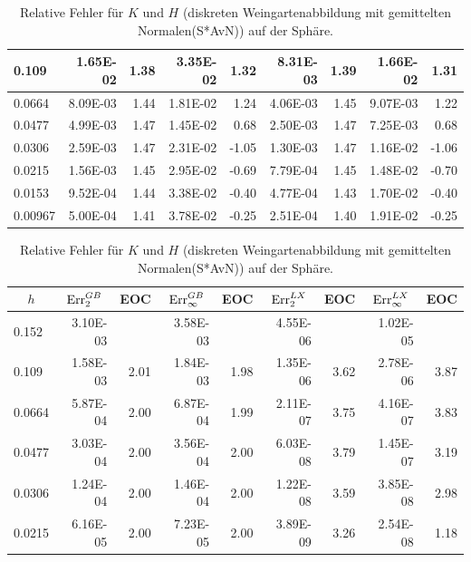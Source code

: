 \begin{table}[htbp]
\begin{tabular}{|l|r|r|r|r|r|r|r|r|}
            0.109 & 1.65E-02 & 1.38 & 3.35E-02 & 1.32 & 8.31E-03 & 1.39 & 1.66E-02 & 1.31 \\ \hline
            0.0664 & 8.09E-03 & 1.44 & 1.81E-02 & 1.24 & 4.06E-03 & 1.45 & 9.07E-03 & 1.22 \\ \hline
            0.0477 & 4.99E-03 & 1.47 & 1.45E-02 & 0.68 & 2.50E-03 & 1.47 & 7.25E-03 & 0.68 \\ \hline
            0.0306 & 2.59E-03 & 1.47 & 2.31E-02 & -1.05 & 1.30E-03 & 1.47 & 1.16E-02 & -1.06 \\ \hline
            0.0215 & 1.56E-03 & 1.45 & 2.95E-02 & -0.69 & 7.79E-04 & 1.45 & 1.48E-02 & -0.70 \\ \hline
            0.0153 & 9.52E-04 & 1.44 & 3.38E-02 & -0.40 & 4.77E-04 & 1.43 & 1.70E-02 & -0.40 \\ \hline
            0.00967 & 5.00E-04 & 1.41 & 3.78E-02 & -0.25 & 2.51E-04 & 1.40 & 1.91E-02 & -0.25 \\ \hline
      \end{tabular}
      \caption[Weingarten auf der Sphäre]{Relative Fehler für \( K \) und \( H \) (diskreten Weingartenabbildung mit gemittelten Normalen(S*AvN)) auf der Sphäre.}
      \label{tabSphereWeingartenAvN}
      \vspace{10pt}
      \begin{tabular}{|l|r|r|r|r|r|r|r|r|}
      \hline
      \multicolumn{1}{|c|}{\rule{0pt}{11pt}\( h \)} & \multicolumn{1}{c|}{\( \text{Err}_{2}^{GB} \)} & \multicolumn{1}{c|}{EOC} & 
           \multicolumn{1}{c|}{\( \text{Err}_{\infty}^{GB} \)} & \multicolumn{1}{c|}{EOC} & \multicolumn{1}{c|}{\( \text{Err}_{2}^{LX} \)} &
           \multicolumn{1}{c|}{EOC} & \multicolumn{1}{c|}{\( \text{Err}_{\infty}^{LX} \)} & \multicolumn{1}{c|}{EOC} \\ \hline
           0.152 & 3.10E-03 & \multicolumn{1}{l|}{} & 3.58E-03 & \multicolumn{1}{l|}{} & 4.55E-06 & \multicolumn{1}{l|}{} & 1.02E-05 & \multicolumn{1}{l|}{} \\ \hline
            0.109 & 1.58E-03 & 2.01 & 1.84E-03 & 1.98 & 1.35E-06 & 3.62 & 2.78E-06 & 3.87 \\ \hline
            0.0664 & 5.87E-04 & 2.00 & 6.87E-04 & 1.99 & 2.11E-07 & 3.75 & 4.16E-07 & 3.83 \\ \hline
            0.0477 & 3.03E-04 & 2.00 & 3.56E-04 & 2.00 & 6.03E-08 & 3.79 & 1.45E-07 & 3.19 \\ \hline
            0.0306 & 1.24E-04 & 2.00 & 1.46E-04 & 2.00 & 1.22E-08 & 3.59 & 3.85E-08 & 2.98 \\ \hline
            0.0215 & 6.16E-05 & 2.00 & 7.23E-05 & 2.00 & 3.89E-09 & 3.26 & 2.54E-08 & 1.18 \\ \hline

\end{tabular}
\end{table}
